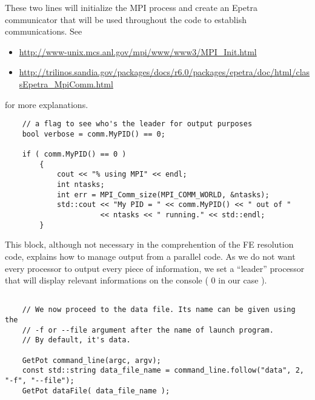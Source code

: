 These two lines will initialize the MPI process and create an Epetra communicator
that will be used throughout the code to establish communications. See
\begin{itemize}
\item \url{http://www-unix.mcs.anl.gov/mpi/www/www3/MPI\_Init.html}
\item \url{http://trilinos.sandia.gov/packages/docs/r6.0/packages/epetra/doc/html/classEpetra\_MpiComm.html}
\end{itemize}
for more explanations.

\begin{verbatim}
    // a flag to see who's the leader for output purposes
    bool verbose = comm.MyPID() == 0;

    if ( comm.MyPID() == 0 )
        {
            cout << "% using MPI" << endl;
            int ntasks;
            int err = MPI_Comm_size(MPI_COMM_WORLD, &ntasks);
            std::cout << "My PID = " << comm.MyPID() << " out of "
                      << ntasks << " running." << std::endl;
        }
\end{verbatim}
This block, although not necessary in the comprehention of the FE resolution code, explains
how to manage output from a parallel code. As we do not want every processor to output
every piece of information, we set a ``leader'' processor that will display relevant
informations on the console ( 0 in our case ).
\begin{verbatim}

    // We now proceed to the data file. Its name can be given using the
    // -f or --file argument after the name of launch program.
    // By default, it's data.

    GetPot command_line(argc, argv);
    const std::string data_file_name = command_line.follow("data", 2, "-f", "--file");
    GetPot dataFile( data_file_name );

\end{verbatim}

